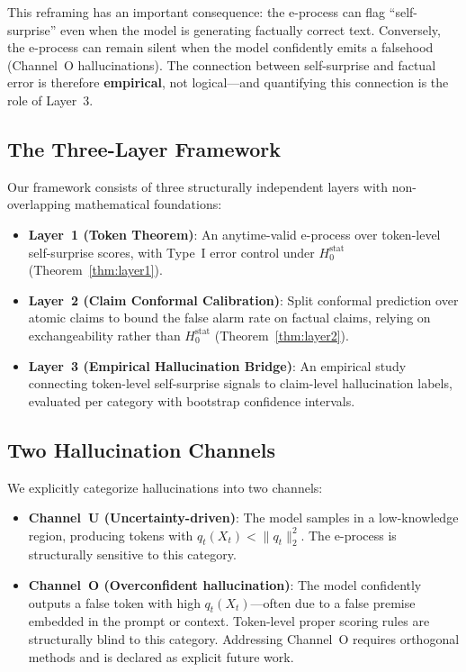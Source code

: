 \documentclass[runningheads]{llncs}
\newcommand{\Hnull}{H_0^{\text{stat}}}
\begin{document}
This reframing has an important consequence: the e-process can flag
``self-surprise'' even when the model is generating factually correct text.
Conversely, the e-process can remain silent when the model confidently emits a
falsehood (Channel~O hallucinations). The connection between self-surprise and
factual error is therefore \textbf{empirical}, not logical---and quantifying
this connection is the role of Layer~3.

\subsection{The Three-Layer Framework}

Our framework consists of three structurally independent layers with
non-overlapping mathematical foundations:
\begin{itemize}
    \item \textbf{Layer~1 (Token Theorem)}: An anytime-valid e-process over
          token-level self-surprise scores, with Type~I error control under
          $\Hnull$ (Theorem~\ref{thm:layer1}).
    \item \textbf{Layer~2 (Claim Conformal Calibration)}: Split conformal
          prediction over atomic claims to bound the false alarm rate on
          factual claims, relying on exchangeability rather than $\Hnull$
          (Theorem~\ref{thm:layer2}).
    \item \textbf{Layer~3 (Empirical Hallucination Bridge)}: An empirical
          study connecting token-level self-surprise signals to claim-level
          hallucination labels, evaluated per category with bootstrap
          confidence intervals.
\end{itemize}

\subsection{Two Hallucination Channels}

We explicitly categorize hallucinations into two channels:
\begin{itemize}
    \item \textbf{Channel~U (Uncertainty-driven)}: The model samples in a
          low-knowledge region, producing tokens with
          $q_t(X_t) < \|q_t\|_2^2$. The e-process is structurally sensitive
          to this category.
    \item \textbf{Channel~O (Overconfident hallucination)}: The model
          confidently outputs a false token with high $q_t(X_t)$---often
          due to a false premise embedded in the prompt or context. Token-level
          proper scoring rules are structurally blind to this category.
          Addressing Channel~O requires orthogonal methods and is declared
          as explicit future work.
\end{itemize}
\end{document}
